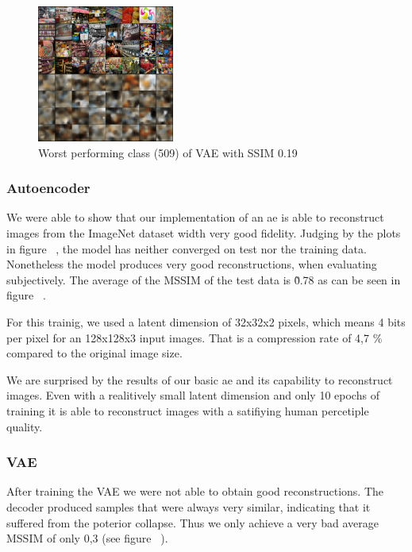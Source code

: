     \begin{figure}
        \centering
        \includegraphics[width=0.4\textwidth]{../../sample_images/evaluation/MIN_VAE_IDX_509.png}
        \caption{Worst performing class (509) of VAE with SSIM 0.19}
        \label{fig:imnet_worst_perf2_vae}
    \end{figure}
    
    \subsubsection{Autoencoder}\label{subsubsec:autoencoder}
        We were able to show that our implementation of an \ac{ae} is able to reconstruct images from the ImageNet dataset width very good fidelity.
        Judging by the plots in figure ~\cite{citationNeeded}, the model has neither converged on test nor the training data.
        Nonetheless the model produces very good reconstructions, when evaluating subjectively.
        The average of the MSSIM of the test data is \~0.78 as can be seen in figure ~\cite{citationNeeded}.

        For this trainig, we used a latent dimension of 32x32x2 pixels, which means 4 bits per pixel for an 128x128x3 input images. That is a compression rate of 4,7 \% compared to the original image size.

        We are surprised by the results of our basic \ac{ae} and its capability to reconstruct images. Even with a realitively small latent dimension and only 10 epochs of training it is able to reconstruct images with a satifiying human percetiple quality.
    
    \subsubsection{VAE}\label{subsubsec:vae_training}
        After training the VAE we were not able to obtain good reconstructions.
        The decoder produced samples that were always very similar, indicating that it suffered from the poterior collapse.
        Thus we only achieve a very bad average MSSIM of only 0,3 (see figure ~\cite{citationNeeded}).


